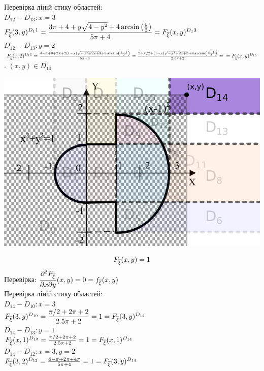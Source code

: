 \documentclass[14pt,a4paper]{scrartcl}
\theoremstyle{definition}
\theoremstyle{remark}
\theoremstyle{definition}
\theoremstyle{definition}
\begin{document}
Перевірка ліній стику областей:\\
$D_{12} - D_{13} : x = 3$\\
$ F_{\overline{\xi}} (3,y)^{D_11} = \dfrac{3\pi + 4 + y\sqrt{4-y^2}+4\arcsin\left(\frac{y}{2} \right)}{5\pi + 4}  = F_{\overline{\xi}} (x,y)^{D_13}$\\
$D_{12} - D_{13} : y = 2$\\
$ F_{\overline{\xi}} (x,2)^{D_11} = \frac{ 4-\pi + 0+2\pi +2\left(1-x\right)\sqrt{-x^2+2x+3}+8\arcsin\left(\frac{x-1}{2}\right) }{5\pi + 4} = \frac{ 2+\pi/2 +\left(1-x\right)\sqrt{-x^2+2x+3}+4\arcsin\left(\frac{x-1}{2}\right) }{2.5\pi + 2} = \\= F_{\overline{\xi}} (x,y)^{D_{10}}$\\

. $(x,y) \in D_{14}$
\begin{center} \includegraphics[scale=0.4]{assets/15finalzone.png} \end{center}
$$
F_{\overline{\xi}} (x,y) = 1
$$
Перевірка:
$\dfrac{\partial^2 F_{\overline{\xi}}}{\partial x \partial y}(x,y) = 0  = f_{\overline{\xi}} (x,y)$\\
Перевірка ліній стику областей:\\
$D_{14} - D_{10}: x = 3$\\
$ F_{\overline{\xi}} (3,y)^{D_{10}} = \dfrac{\pi/2+ 2\pi + 2} { 2.5\pi + 2} = 1 =  F_{\overline{\xi}} (3,y)^{D_{14}} $\\
$D_{14} - D_{13}: y = 1$\\
$ F_{\overline{\xi}} (x,1)^{D_{13}} = \frac{\pi/2+ 2\pi + 2} { 2.5\pi + 2} = 1 =  F_{\overline{\xi}} (x,1)^{D_{14}} $\\
$D_{14} - D_{12}: x = 3, y =2$\\
$ F_{\overline{\xi}} (3,2)^{D_{12}} = \frac{4 - \pi + 2\pi + 4\pi} { 5\pi + 4} = 1 =  F_{\overline{\xi}} (3,y)^{D_{14}} $\\
\end{document}
